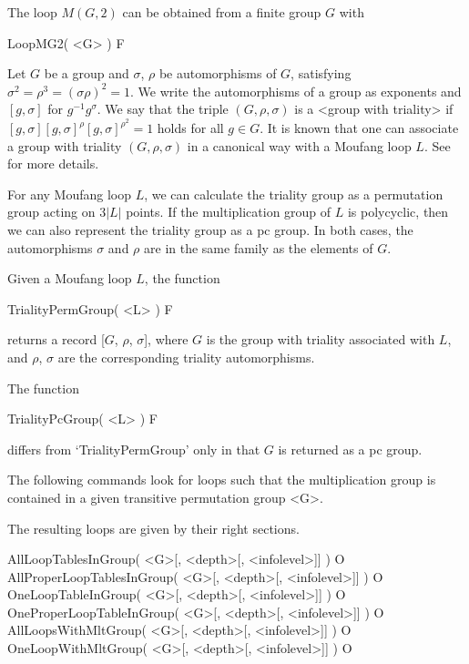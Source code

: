 The loop $M(G,2)$ can be obtained from a finite group $G$ with

\>LoopMG2( <G> ) F


Let $G$ be a group and $\sigma$, $\rho$ be automorphisms of $G$, satisfying
$\sigma^2 = \rho^3 = (\sigma \rho)^2 = 1$. We write the automorphisms of a
group as exponents and $[g,\sigma]$ for $g^{-1}g^\sigma$. We say that the
triple $(G,\rho,\sigma)$ is a <group with triality>
if $[g, \sigma] [g,\sigma]^\rho [g,\sigma]^{\rho^2} =1$ holds for all $g \in
G$. It is known that one can associate a group with triality $(G,\rho,\sigma)$
in a canonical way with a Moufang loop $L$. See \cite{NaVo2003} for more
details.

For any Moufang loop $L$, we can calculate the triality group as a permutation
group acting on $3|L|$ points. If the multiplication group of $L$ is
polycyclic, then we can also represent the triality group as a pc group. In
both cases, the automorphisms $\sigma$ and $\rho$ are in the same family as the
elements of $G$.

Given a Moufang loop $L$, the function

\>TrialityPermGroup( <L> ) F

returns a record [$G$, $\rho$, $\sigma$], where $G$ is the group with triality
associated with $L$, and $\rho$, $\sigma$ are the corresponding triality
automorphisms.

The function

\>TrialityPcGroup( <L> ) F

differs from `TrialityPermGroup' only in that $G$ is returned as a pc group.


The following commands look for loops such that the multiplication group is
contained in a given transitive permutation group <G>.

The resulting loops are given by their right sections.

\>AllLoopTablesInGroup( <G>[, <depth>[, <infolevel>]] ) O
\>AllProperLoopTablesInGroup( <G>[, <depth>[, <infolevel>]] ) O
\>OneLoopTableInGroup( <G>[, <depth>[, <infolevel>]] ) O
\>OneProperLoopTableInGroup( <G>[, <depth>[, <infolevel>]] ) O
\>AllLoopsWithMltGroup( <G>[, <depth>[, <infolevel>]] ) O
\>OneLoopWithMltGroup( <G>[, <depth>[, <infolevel>]] ) O

